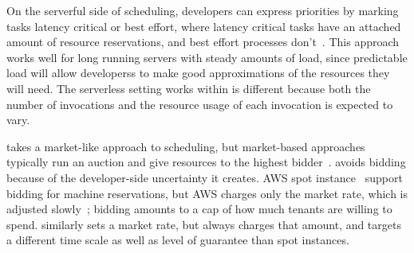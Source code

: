 On the serverful side of scheduling, developers can express priorities
by marking tasks latency critical or best effort, where latency
critical tasks have an attached amount of resource reservations, and
best effort processes don't~\cite{kubernetes-lc-be}.  This approach
works well for long running servers with steady amounts of load, since
predictable load will allow developerss to make good approximations of
the resources they will need. The serverless setting \sys{} works
within is different because both the number of invocations and the
resource usage of each invocation is expected to vary.

\Sys{} takes a market-like approach to scheduling, but market-based
approaches typically run an auction and give resources to the highest
bidder~\cite{bellagio-market-based,online-auctioning}. \Sys{} avoids
bidding because of the developer-side uncertainty it creates. AWS spot
instance~\cite{spot-instance-pricing} support bidding for machine
reservations, but AWS charges only the market rate, which is adjusted
slowly~\cite{spot-instance-history}; bidding amounts to a cap of how
much tenants are willing to spend. \Sys{} similarly sets a market
rate, but always charges that amount, and targets a different time
scale as well as level of guarantee than spot instances.


